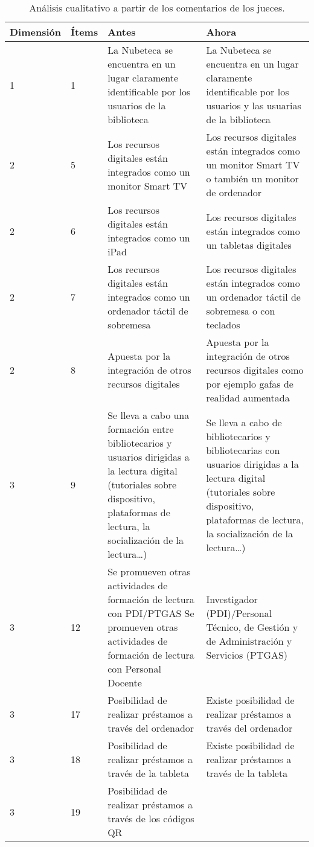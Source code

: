 \documentclass[spanish]{textolivre}
\begin{document}
\begin{table}[htbp]
\footnotesize
\centering
\begin{threeparttable}
\caption{Análisis cualitativo a partir de los comentarios de los jueces.}
\label{tb10}
\centering
\begin{tabular}{ll p{5cm} p{5cm}}
\toprule
Dimensión & Ítems & Antes & Ahora \\ 
\midrule
1 & 1 & La Nubeteca se encuentra en un lugar claramente identificable por los usuarios de la biblioteca & La Nubeteca se encuentra en un lugar claramente identificable por los usuarios y las usuarias de la biblioteca \\
2 & 5 & Los recursos digitales están integrados como un monitor Smart TV & 
Los recursos digitales están integrados como un monitor Smart TV o también un monitor de ordenador \\
2 & 6 & Los recursos digitales están integrados como un iPad & Los recursos digitales están integrados como un tabletas digitales \\
2 & 7 & Los recursos digitales están integrados como un ordenador táctil de sobremesa & Los recursos digitales están integrados como un ordenador táctil de sobremesa o con teclados \\
2 & 8 & Apuesta por la integración de otros recursos digitales & Apuesta por la integración de otros recursos digitales  como por ejemplo gafas de realidad aumentada \\
3 & 9 & Se lleva a cabo una formación entre bibliotecarios y usuarios dirigidas a la lectura digital (tutoriales sobre dispositivo, plataformas de lectura, la socialización de la lectura…) & Se lleva a cabo de bibliotecarios y bibliotecarias  con usuarios dirigidas a la lectura digital (tutoriales sobre dispositivo, plataformas de lectura, la socialización de la lectura…) \\
3 & 12 & Se promueven otras actividades de formación de lectura con PDI/PTGAS
Se promueven otras actividades de formación de lectura con Personal Docente &  Investigador (PDI)/Personal Técnico, de Gestión y de Administración y Servicios (PTGAS) \\
3 & 17 & Posibilidad de realizar préstamos a través del ordenador & 
Existe posibilidad de realizar préstamos a través del ordenador \\
3 & 18 & Posibilidad de realizar préstamos a través de la tableta & Existe posibilidad de realizar préstamos a través de la tableta \\
3 & 19 & Posibilidad de realizar préstamos a través de los códigos QR & 

\end{tabular}
\end{threeparttable}
\end{table}
\end{document}
